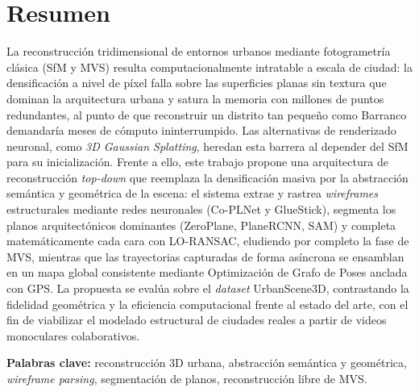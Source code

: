 \chapter*{Resumen}

La reconstrucción tridimensional de entornos urbanos mediante fotogrametría clásica (SfM y MVS) resulta computacionalmente intratable a escala de ciudad: la densificación a nivel de píxel falla sobre las superficies planas sin textura que dominan la arquitectura urbana y satura la memoria con millones de puntos redundantes, al punto de que reconstruir un distrito tan pequeño como Barranco demandaría meses de cómputo ininterrumpido. Las alternativas de renderizado neuronal, como \textit{3D Gaussian Splatting}, heredan esta barrera al depender del SfM para su inicialización. Frente a ello, este trabajo propone una arquitectura de reconstrucción \textit{top-down} que reemplaza la densificación masiva por la abstracción semántica y geométrica de la escena: el sistema extrae y rastrea \textit{wireframes} estructurales mediante redes neuronales (Co-PLNet y GlueStick), segmenta los planos arquitectónicos dominantes (ZeroPlane, PlaneRCNN, SAM) y completa matemáticamente cada cara con LO-RANSAC, eludiendo por completo la fase de MVS, mientras que las trayectorias capturadas de forma asíncrona se ensamblan en un mapa global consistente mediante Optimización de Grafo de Poses anclada con GPS. La propuesta se evalúa sobre el \textit{dataset} UrbanScene3D, contrastando la fidelidad geométrica y la eficiencia computacional frente al estado del arte, con el fin de viabilizar el modelado estructural de ciudades reales a partir de videos monoculares colaborativos.

\vspace{0.5cm}
\noindent\textbf{Palabras clave:} reconstrucción 3D urbana, abstracción semántica y geométrica, \textit{wireframe parsing}, segmentación de planos, reconstrucción libre de MVS.
